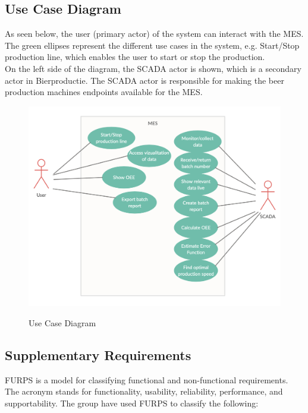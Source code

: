 \subsection{Use Case Diagram}
As seen below, the user (primary actor) of the system can interact with the MES.
The green ellipses represent the different use cases in the system, e.g.
Start/Stop production line, which enables the user to start or stop the
production. \\

On the left side of the diagram, the SCADA actor is shown, which is a secondary
actor in Bierproductie. The SCADA actor is responsible for making the beer
production machines endpoints available for the MES. 

\begin{figure}[H]
\centering 
\includegraphics[scale=0.5]{images/ucdiagram.png}
\label{figure:Use_Case_Diagram}
\caption{Use Case Diagram} 
\end{figure}

\subsection{Supplementary Requirements}
FURPS is a model for classifying functional and non-functional requirements. The
acronym stands for functionality, usability, reliability, performance, and
supportability. The group have used FURPS to classify the following: 

